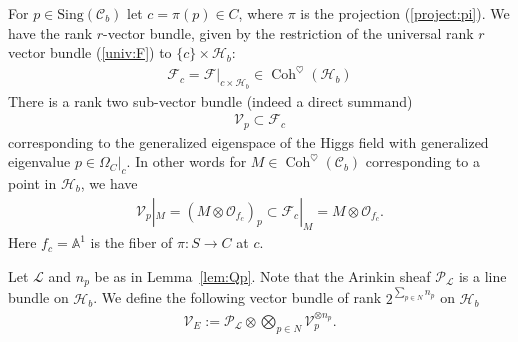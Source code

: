 \documentclass[11pt,oneside,a4paper,mathscr]{amsart}
\theoremstyle{definition}
\newcommand{\cH}{\mathcal{H}}
\newcommand{\cC}{\mathcal{C}}
\newcommand{\cP}{\mathcal{P}}
\newcommand{\cF}{\mathcal{F}}
\newcommand{\cO}{\mathcal{O}}
\newcommand{\Coh}{\operatorname{Coh}}
\begin{document}
For $p\in \mathrm{Sing}(\cC_b)$ let $c=\pi(p) \in C$, where $\pi$ is the projection (\ref{project:pi}). 
We have the rank $r$-vector bundle, given by the restriction of the universal rank $r$ vector bundle (\ref{univ:F}) to $\{c\}\times \cH_b$:
\begin{align*}
    \cF_c=\cF|_{c\times \cH_b} \in \Coh^{\heartsuit}(\cH_b) 
\end{align*}
There is a rank two sub-vector bundle (indeed a direct summand)
\begin{align}\label{def:Vp}
    \mathcal{V}_p \subset \mathcal{F}_c
\end{align}
corresponding to the generalized eigenspace of the Higgs field with 
generalized eigenvalue $p \in \Omega_{C}|_{c}$. In other words
for $M\in \Coh^{\heartsuit}(\cC_b)$ corresponding to a point in $\cH_b$, 
we have 
\begin{align*}
    \mathcal{V}_p|_{M}=(M\otimes \mathcal{O}_{f_c})_p \subset \cF_c|_{M}=M\otimes \cO_{f_c}. 
\end{align*}
Here $f_c=\mathbb{A}^1$ is the fiber of $\pi \colon S \to C$ at $c$.

Let $\mathcal{L}$ and $n_p$ be as in Lemma~\ref{lem:Qp}. Note that 
the Arinkin sheaf $\cP_{\mathcal{L}}$ is a line bundle on $\cH_b$. 
We define the following 
vector bundle of rank $2^{\sum_{p\in N}n_p}$ on $\cH_b$
\begin{align}\label{def:VE}
    \mathcal{V}_E:=\mathcal{P}_{\mathcal{L}}\otimes \bigotimes_{p\in N}\mathcal{V}_p^{\otimes n_p}.
\end{align}
\end{document}
